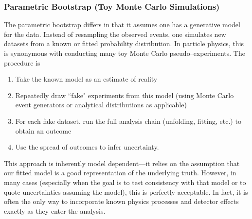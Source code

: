         \subsubsection{Parametric Bootstrap (Toy Monte Carlo Simulations)}
            The parametric bootstrap differs in that it assumes one has a generative model for the data.
            Instead of resampling the observed events, one simulates new datasets from a known or fitted probability distribution.
            In particle physics, this is synonymous with conducting many toy Monte Carlo pseudo--experiments.
            The procedure is
            \begin{enumerate}
                \item Take the known model as an estimate of reality
                \item Repeatedly draw ``fake" experiments from this model (using Monte Carlo event generators or analytical distributions as applicable)
                \item For each fake dataset, run the full analysis chain (unfolding, fitting, etc.) to obtain an outcome
                \item Use the spread of outcomes to infer uncertainty.
            \end{enumerate}
            This approach is inherently model dependent---it relies on the assumption that our fitted model is a good representation of the underlying truth.
            However, in many cases (especially when the goal is to test consistency with that model or to quote uncertainties assuming the model), this is perfectly acceptable.
            In fact, it is often the only way to incorporate known physics processes and detector effects exactly as they enter the analysis.


